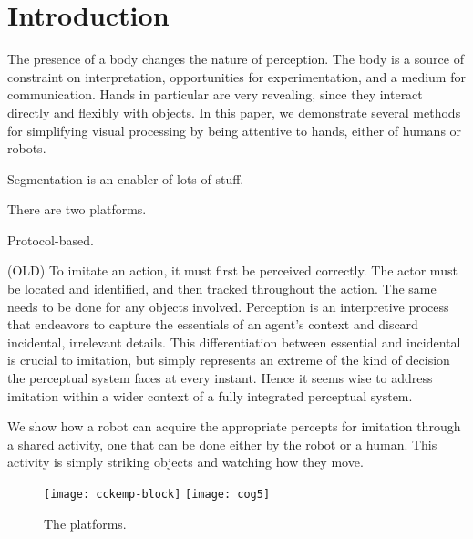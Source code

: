 

\section{Introduction}

The presence of a body changes the nature of perception.  
%
The body is a source of constraint on interpretation, opportunities for
experimentation, and a medium for communication.
%
Hands in particular are very revealing, since they interact directly
and flexibly with objects.  In this paper, we demonstrate several
methods for simplifying visual processing by being attentive
to hands, either of humans or robots.


Segmentation is an enabler of lots of stuff.

There are two platforms.

Protocol-based.


\ifnote

(OLD) To imitate an action, it must first be perceived correctly.  
%
The actor must be located and identified, and then tracked 
throughout the action.  The same needs to be done for
any objects involved.
%
Perception is an interpretive process that endeavors to
capture the essentials of an agent's context and
discard incidental, irrelevant details.
%
This differentiation between essential and incidental
is crucial to imitation, but simply represents an 
extreme of the kind of decision the perceptual system
faces at every instant.  Hence it seems wise to address
imitation within a wider context of a fully integrated 
perceptual system.

%
%
%

We show how a robot can acquire the appropriate percepts for imitation
through a shared activity, one that can be done either by the robot or
a human.  This activity is simply striking objects and watching how
they move.

\fi


\begin{figure}[tb]
\centerline{
\texttt{[image: cckemp-block]}
\texttt{[image: cog5]}}
\caption[Another example]{ 
%
%
The platforms.
%
}
\end{figure}

